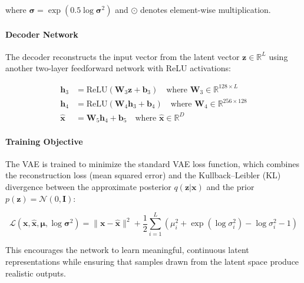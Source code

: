 \documentclass{article}
\begin{document}
where $\boldsymbol{\sigma} = \exp(0.5 \log \boldsymbol{\sigma}^2)$ and $\odot$ denotes element-wise multiplication.

\paragraph{Decoder Network}

The decoder reconstructs the input vector from the latent vector $\mathbf{z} \in \mathbb{R}^L$ using another two-layer feedforward network with ReLU activations:

\begin{align}
\mathbf{h}_3 &= \text{ReLU}(\mathbf{W}_3 \mathbf{z} + \mathbf{b}_3) \quad \text{where } \mathbf{W}_3 \in \mathbb{R}^{128 \times L} \\
\mathbf{h}_4 &= \text{ReLU}(\mathbf{W}_4 \mathbf{h}_3 + \mathbf{b}_4) \quad \text{where } \mathbf{W}_4 \in \mathbb{R}^{256 \times 128} \\
\hat{\mathbf{x}} &= \mathbf{W}_5 \mathbf{h}_4 + \mathbf{b}_5 \quad \text{where } \hat{\mathbf{x}} \in \mathbb{R}^D
\end{align}

\paragraph{Training Objective}

The VAE is trained to minimize the standard VAE loss function, which combines the reconstruction loss (mean squared error) and the Kullback--Leibler (KL) divergence between the approximate posterior $q(\mathbf{z}|\mathbf{x})$ and the prior $p(\mathbf{z}) = \mathcal{N}(0, \mathbf{I})$:

\begin{equation}\label{eq:VAE_loss_function}
\mathcal{L}(\mathbf{x}, \hat{\mathbf{x}}, \boldsymbol{\mu}, \log \boldsymbol{\sigma}^2) = \| \mathbf{x} - \hat{\mathbf{x}} \|^2 + \frac{1}{2} \sum_{i=1}^{L} \left( \mu_i^2 + \exp(\log \sigma_i^2) - \log \sigma_i^2 - 1 \right)
\end{equation}

This encourages the network to learn meaningful, continuous latent representations while ensuring that samples drawn from the latent space produce realistic outputs.
\end{document}

